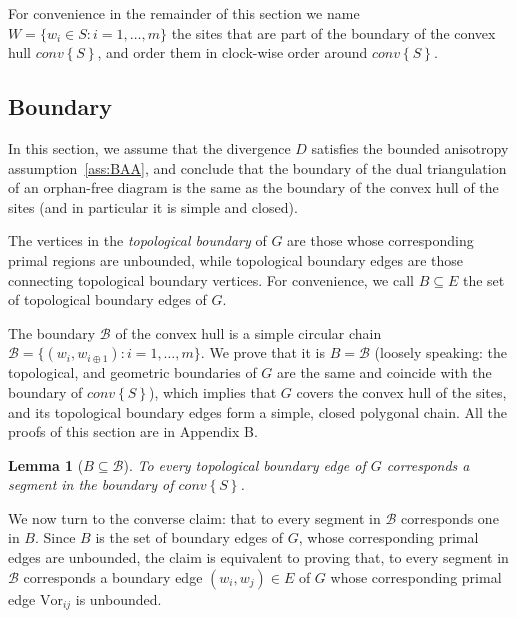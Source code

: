 \documentclass[11pt]{article}
\newtheorem{lemma}{Lemma}
\newcommand{\Sites}{S}
\newcommand{\Vor}{\text{Vor}}
\newcommand{\CHS}{{conv}\left\{\Sites\right\}}
\begin{document}
For convenience in the remainder of this section 
we name $W=\{w_i\in \Sites : i=1,\dots,m\}$ the sites that are part of the boundary of
the convex hull $\CHS$, and order them in clock-wise order around $\CHS$. 



\subsection{Boundary}\label{sec:boundary}

In this section, we assume that the divergence $D$ satisfies the bounded anisotropy assumption~\ref{ass:BAA},
 and conclude that the boundary of the dual triangulation of an orphan-free diagram is the same as the boundary of the convex hull of the sites (and in particular it is simple and closed). 

The vertices in the \emph{topological boundary} of $G$ are those 
	whose corresponding primal regions are unbounded, 
while topological boundary edges are those connecting topological boundary vertices. 
For convenience, we call $B\subseteq E$ the set of topological boundary edges of $G$. 

The boundary $\mathcal{B}$ of the convex hull is a simple circular chain 
$\mathcal{B} = \{(w_i, w_{i\oplus 1}) : i=1,\dots,m\}$. We prove that it is $B=\mathcal{B}$ 
(loosely speaking: the topological, and geometric boundaries of $G$ are the same and coincide with the boundary of $\CHS$), 
which implies that $G$ covers
the convex hull of the sites, and its topological boundary edges form 
a simple, closed polygonal chain. All the proofs of this section are in Appendix B. 

\begin{lemma}[$B\subseteq\mathcal{B}$]\label{boundary_easy}
 To every topological boundary edge of $G$ corresponds a segment in the boundary of $\CHS$.
\end{lemma}



We now turn to the converse claim: that to every segment 
in $\mathcal{B}$ corresponds one in $B$. Since $B$ is the set of boundary edges of $G$, whose corresponding primal edges 
are unbounded, the claim is equivalent to proving that, to every segment
in $\mathcal{B}$ corresponds a boundary edge $(w_i,w_j)\in E$ of $G$ whose corresponding primal edge $\Vor_{ij}$ is unbounded. 
\end{document}

